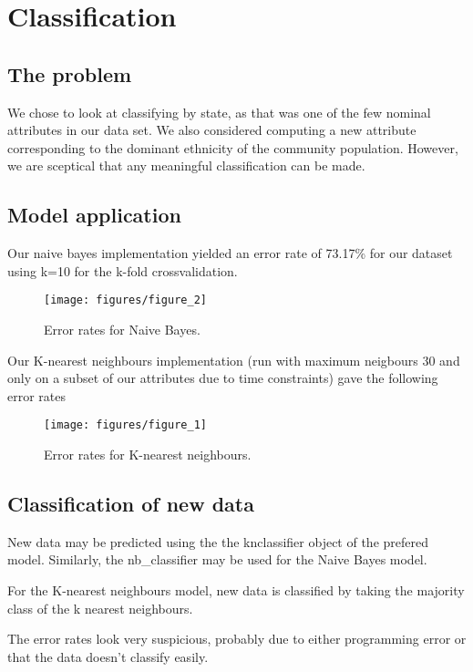 


\section{Classification}
\subsection{The problem}
We chose to look at classifying by state, as that was one of the few nominal attributes in our data set. We also considered computing a new attribute corresponding to the dominant ethnicity of the community population. However, we are sceptical that any meaningful classification can be made.

\subsection{Model application}
Our naive bayes implementation yielded an error rate of 73.17\% for our dataset using k=10 for the k-fold crossvalidation.
    \begin{figure}[H]
      \centering
        \texttt{[image: figures/figure\_2]}
        \caption{Error rates for Naive Bayes.}
        \label{fig:k}
    \end{figure}

Our K-nearest neighbours implementation (run with maximum neigbours 30 and only on a subset of our attributes due to time constraints) gave the following error rates
    \begin{figure}[H]
      \centering
        \texttt{[image: figures/figure\_1]}
        \caption{Error rates for K-nearest neighbours.}
        \label{fig:k}
    \end{figure}

\subsection{Classification of new data}
New data may be predicted using the the knclassifier object of the prefered model. Similarly, the nb\_classifier may be used for the Naive Bayes model.

For the K-nearest neighbours model, new data is classified by taking the majority class of the k nearest neighbours.

The error rates look very suspicious, probably due to either programming error or that the data doesn't classify easily.

